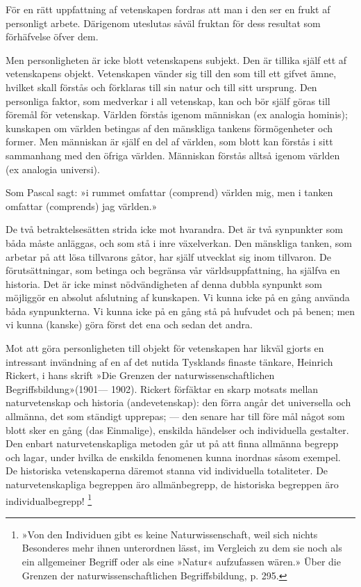 \documentclass[12pt]{article}
\newcommand{\opage}[1]{\marginnote{\footnotesize\textit{[#1]}}}
\begin{document}
För en rätt uppfattning af vetenskapen fordras att man i den ser en frukt af personligt arbete. Därigenom uteslutas såväl fruktan för dess resultat som förhäfvelse öfver dem.

Men personligheten är icke blott vetenskapens subjekt. Den är tillika själf ett af vetenskapens objekt. Vetenskapen vänder sig till den som till ett gifvet ämne, hvilket skall förstås och förklaras till sin natur och till sitt ursprung. Den personliga faktor, som medverkar i all vetenskap, kan och bör själf göras till föremål för vetenskap. Världen förstås igenom människan (ex analogia hominis); kunskapen om världen betingas af den mänskliga tankens förmögenheter och former. Men människan är själf en del af världen, som blott kan förstås i sitt sammanhang med den öfriga världen. Människan förstås alltså igenom världen (ex analogia universi).

Som Pascal sagt: »i rummet omfattar %
\opage{19}
(comprend) världen mig, men i tanken omfattar (comprends) jag världen.»

De två betraktelsesätten strida icke mot hvarandra. Det är två synpunkter som båda måste anläggas, och som stå i inre växelverkan. Den mänskliga tanken, som arbetar på att lösa tillvarons gåtor, har själf utvecklat sig inom tillvaron. De förutsättningar, som betinga och begränsa vår världsuppfattning, ha själfva en historia. Det är icke minst nödvändigheten af denna dubbla synpunkt som möjliggör %
en absolut afslutning af kunskapen. Vi kunna icke på en gång använda båda synpunkterna. Vi kunna icke på en gång stå på hufvudet och på benen; men vi kunna (kanske) göra först det ena och sedan det andra.

Mot att göra personligheten till objekt för vetenskapen har likväl gjorts en intressant invändning af en af det nutida Tysklands finaste tänkare, Heinrich Rickert, i hans skrift »Die Grenzen der naturwissenschaftlichen Begriffsbildung»(1901--- 1902). Rickert förfäktar en skarp motsats mellan naturvetenskap och historia (andevetenskap): den förra angår det universella och allmänna, det som ständigt upprepas; --- den senare har till före%
\opage{20}
mål något som blott sker en gång (das Einmalige), enskilda händelser och individuella gestalter. Den enbart naturvetenskapliga metoden går ut på att finna allmänna begrepp och lagar, under hvilka de enskilda fenomenen kunna inordnas såsom exempel. De historiska vetenskaperna däremot stanna vid individuella totaliteter. De naturvetenskapliga begreppen äro allmänbegrepp, de historiska begreppen äro individualbegrepp!%
\footnote[1]{»Von den Individuen gibt es keine Naturwissenschaft, weil sich nichts Besonderes mehr ihnen unterordnen lässt, im Vergleich zu dem sie noch als ein allgemeiner Begriff oder als eine »Natur« aufzufassen wären.» Über die Grenzen der naturwissenschaftlichen Begriffsbildung, p. 295.}
\end{document}
